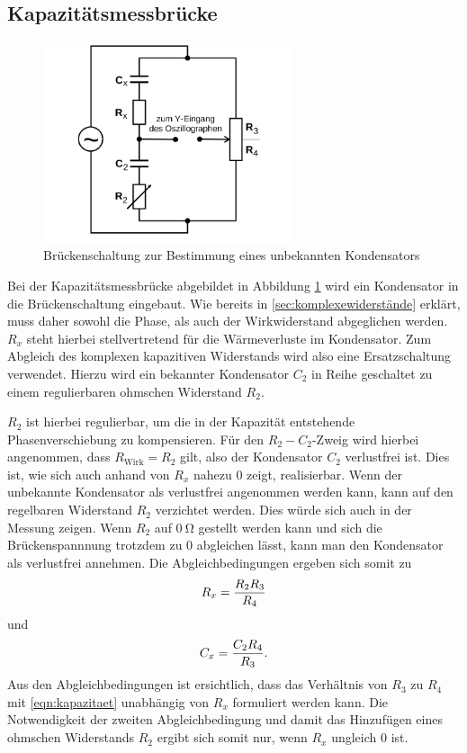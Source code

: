 \subsection{Kapazitätsmessbrücke}
\begin{figure}
  \centering
  \includegraphics[width=0.65\textwidth]{Bilder/kapazitaetmessbruecke.png}
  \caption{Brückenschaltung zur Bestimmung eines unbekannten Kondensators \cite{Anleitung}}
  \label{fig:kapazitätsmessbrücke}
\end{figure}
Bei der Kapazitätsmessbrücke abgebildet in Abbildung \ref{fig:kapazitätsmessbrücke} wird ein Kondensator in die Brückenschaltung eingebaut.
Wie bereits in \ref{sec:komplexewiderstände} erklärt, muss daher sowohl die Phase, als auch der Wirkwiderstand abgeglichen werden.
$R_x$ steht hierbei stellvertretend für die Wärmeverluste im Kondensator. Zum Abgleich des komplexen kapazitiven Widerstands wird also eine Ersatzschaltung verwendet.
Hierzu wird ein bekannter Kondensator $C_2$ in Reihe geschaltet zu einem regulierbaren ohmschen Widerstand $R_2$.

$R_2$ ist hierbei regulierbar, um die in der Kapazität entstehende Phasenverschiebung zu kompensieren. Für den $R_2-C_2$-Zweig wird hierbei angenommen, dass $R_{\text{Wirk}}=R_2$ gilt, also der Kondensator $C_2$ verlustfrei ist. Dies ist, wie sich auch anhand von $R_x$ nahezu 0 zeigt, realisierbar.
Wenn der unbekannte Kondensator als verlustfrei angenommen werden kann, kann auf den regelbaren Widerstand $R_2$ verzichtet werden.
Dies würde sich auch in der Messung zeigen. Wenn $R_2$ auf $\SI{0}{\ohm}$ gestellt werden kann und sich die Brückenspannnung trotzdem zu $0$ abgleichen lässt, kann man den Kondensator als verlustfrei annehmen.
Die Abgleichbedingungen ergeben sich somit zu
\begin{equation}
\centering
\label{eqn:kapwiderstand}
R_x=\frac{R_2R_3}{R_4}
\end{equation}
und
\begin{equation}
\centering
\label{eqn:kapazitaet}
C_x=\frac{C_2R_4}{R_3}\text{.}
\end{equation}
Aus den Abgleichbedingungen ist ersichtlich, dass das Verhältnis von $R_3$ zu $R_4$ mit \eqref{eqn:kapazitaet} unabhängig von $R_x$ formuliert werden kann.
Die Notwendigkeit der zweiten Abgleichbedingung und damit das Hinzufügen eines ohmschen Widerstands $R_2$ ergibt sich somit nur, wenn $R_x$ ungleich 0 ist.

